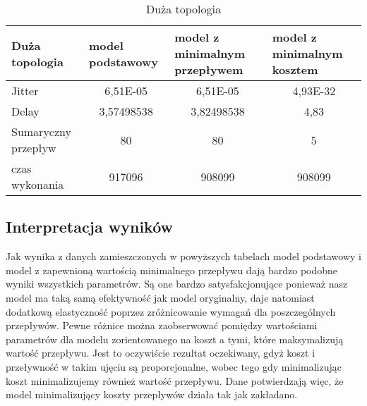 \begin{table}[!h]
\centering
\caption{Duża topologia}
\label{my-label}
\begin{tabular}{|l|c|c|c|}
\hline
Duża topologia      & \multicolumn{1}{l|}{model podstawowy} & \multicolumn{1}{l|}{model z minimalnym przepływem} & \multicolumn{1}{l|}{model z minimalnym kosztem} \\ \hline
Jitter              & 6,51E-05                              & 6,51E-05                                           & 4,93E-32                                        \\ \hline
Delay               & 3,57498538                            & 3,82498538                                         & 4,83                                            \\ \hline
Sumaryczny przepływ & 80                                    & 80                                                 & 5                                               \\ \hline
czas wykonania      & 917096                                & 908099                                             & 908099                                          \\ \hline
\end{tabular}
\end{table}

\subsection{Interpretacja wyników}

Jak wynika z danych zamieszczonych w powyższych tabelach model podstawowy i model z zapewnioną
wartością minimalnego przepływu dają bardzo podobne wyniki wszystkich parametrów. Są one bardzo
satysfakcjonujące ponieważ nasz model ma taką samą efektywność jak model oryginalny, daje natomiast
dodatkową elastyczność poprzez zróżnicowanie wymagań dla poszczególnych przepływów. Pewne różnice można
zaobserwować pomiędzy wartościami parametrów dla modelu zorientowanego na koszt a tymi, które maksymalizują
wartość przepływu. Jest to oczywiście rezultat oczekiwany, gdyż koszt i przeływność w takim ujęciu
są proporcjonalne, wobec tego gdy minimalizując koszt minimalizujemy również wartość przepływu. Dane potwierdzają więc,
że model minimalizujący koszty przepływów działa tak jak zakładano.
